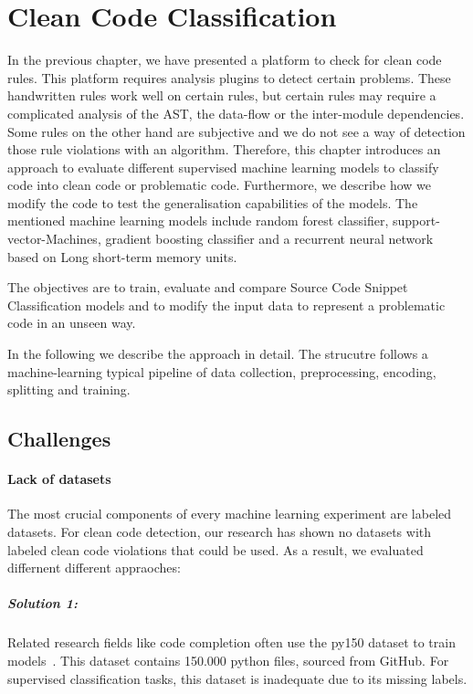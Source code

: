 \section{Clean Code Classification}\label{chap:clean_code_classification}
In the previous chapter, we have presented a platform to check for clean code rules. This platform requires analysis plugins to detect certain problems. These handwritten rules work well on certain rules, but certain rules may require a complicated analysis of the AST, the data-flow or the inter-module dependencies. Some rules on the other hand are subjective and we do not see a way of detection those rule violations with an algorithm.
Therefore, this chapter introduces an approach to evaluate different supervised machine learning models to classify code into clean code or problematic code. Furthermore, we describe how we modify the code to test the generalisation capabilities of the models. The mentioned machine learning models include random forest classifier, support-vector-Machines, gradient boosting classifier and a recurrent neural network based on Long short-term memory units. 

The objectives are to train, evaluate and compare Source Code Snippet Classification models and to modify the input data to represent a problematic code in an unseen way.

In the following we describe the approach in detail. The strucutre follows a machine-learning typical pipeline of data collection, preprocessing, encoding, splitting and training. 

\subsection{Challenges}
\paragraph{Lack of datasets}
The most crucial components of every machine learning experiment are labeled datasets. For clean code detection, our research has shown no datasets with labeled clean code violations that could be used.
As a result, we evaluated differnent different appraoches:

\subparagraph{Solution 1:}
Related research fields like code completion often use the py150 dataset to train models~\cite{raychev2016probabilistic}. This dataset contains 150.000 python files, sourced from GitHub. For supervised classification tasks, this dataset is inadequate due to its missing labels.  

